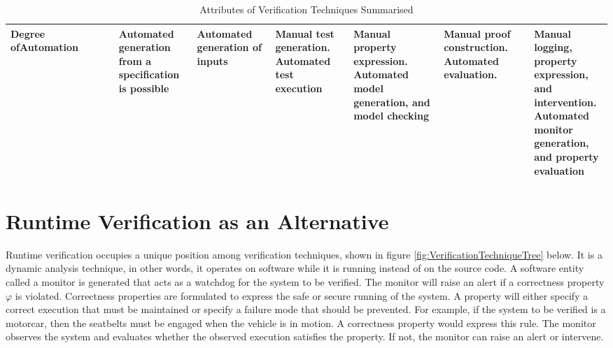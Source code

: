 \begin{table}[h!]
{\begin{tabular}{p{0.18\linewidth} p{0.135\linewidth} p{0.135\linewidth} p{0.135\linewidth} p{0.15\linewidth} p{0.15\linewidth} p{0.21\linewidth}}
Degree of\hspace{0.3\linewidth}Automation & Automated generation from a specification is possible & Automated generation of inputs & Manual test generation.  Automated test execution & Manual property expression.  Automated model generation, and model checking & Manual proof construction.  Automated evaluation. & Manual logging, property expression, and intervention.  Automated monitor generation, and property evaluation\\ \hline
\end{tabular}%
}
\caption{Attributes of Verification Techniques Summarised}
\label{table:VerificationTechniquesSummarised}
\end{table}

\section{Runtime Verification as an Alternative}


Runtime verification occupies a unique position among verification techniques, shown in figure \ref{fig:VerificationTechniqueTree} below.  It is a dynamic analysis technique, in other words, it operates on software while it is running instead of on the source code.  A software entity called a monitor is generated that acts as a watchdog for the system to be verified.  The monitor will raise an alert if a correctness property $\varphi$ is violated.  Correctness properties are formulated to express the safe or secure running of the system.  A property will either specify a correct execution that must be maintained or specify a failure mode that should be prevented.  For example, if the system to be verified is a motorcar, then the seatbelts must be engaged when the vehicle is in motion.  A correctness property would express this rule.  The monitor observes the system and evaluates whether the observed execution satisfies the property.  If not, the monitor can raise an alert or intervene.

